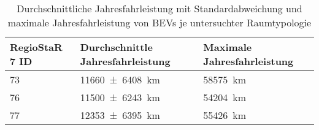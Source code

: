 {
\renewcommand{\arraystretch}{1.2}%
\begin{table}[H]
	\begin{center}
		\caption{Durchschnittliche Jahresfahrleistung mit Standardabweichung und maximale Jahresfahrleistung von BEVs je untersuchter Raumtypologie}
		\begin{tabu} to \textwidth {X[1] X[1.5, r] X[1.5, r]}
			\toprule
			RegioStaR 7 ID 	   & Durchschnittle Jahresfahrleistung                  & Maximale Jahresfahrleistung \\ \midrule
			\num{73}               & \SI[separate-uncertainty = true]{11660(6408)}{\km} & \SI{58575}{\km}             \\
			\num{76}               & \SI[separate-uncertainty = true]{11500(6243)}{\km} & \SI{54204}{\km}             \\
			\num{77}               & \SI[separate-uncertainty = true]{12353(6395)}{\km} & \SI{55426}{\km}             \\ \bottomrule
		\end{tabu}
		\label{tab:bev_distance}
	\end{center}
	\vspace{-3mm}%
\end{table}
}